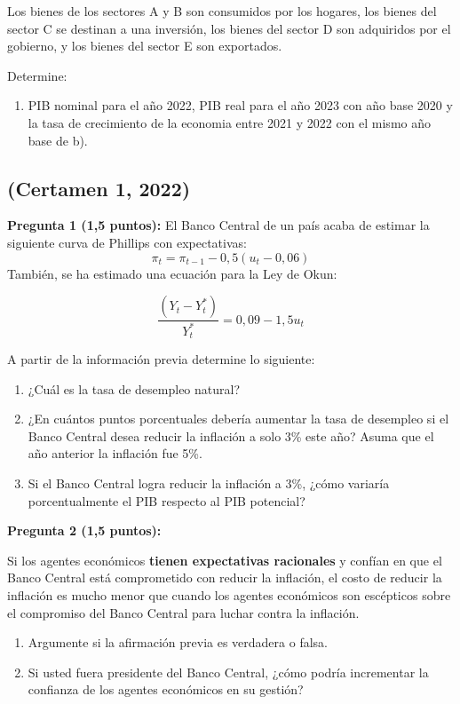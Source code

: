\documentclass[11pt,addpoints]{article}
\begin{document}
Los bienes de los sectores A y B son consumidos por los hogares, los bienes del sector C se destinan a una inversión, los bienes del sector D son adquiridos por el gobierno, y los bienes del sector E son exportados.

Determine:
\begin{enumerate}[label=\alph*)]
    \item PIB nominal para el año 2022, PIB real para el año 2023 con año base 2020 y la tasa de crecimiento de la economia entre 2021 y 2022 con el mismo año base de b).
\end{enumerate}


\subsection*{(Certamen 1, 2022)}
\textbf{Pregunta 1 (1,5 puntos):}  
El Banco Central de un país acaba de estimar la siguiente curva de Phillips con expectativas:  
\[
\pi_t = \pi_{t-1} - 0,5(u_t - 0,06)
\]
\newpage
\vspace*{0.1cm}
También, se ha estimado una ecuación para la Ley de Okun:  

\[
\frac{(Y_t - Y_t^*)}{Y_t^*} = 0,09 - 1,5u_t
\]

A partir de la información previa determine lo siguiente:  

\begin{enumerate}[label=\alph*)]
    \item ¿Cuál es la tasa de desempleo natural?  
    \item ¿En cuántos puntos porcentuales debería aumentar la tasa de desempleo si el Banco Central desea reducir la inflación a solo 3\% este año? Asuma que el año anterior la inflación fue 5\%.  
    \item Si el Banco Central logra reducir la inflación a 3\%, ¿cómo variaría porcentualmente el PIB respecto al PIB potencial?  
\end{enumerate}

\vspace{0.4cm}

\textbf{Pregunta 2 (1,5 puntos):}  

Si los agentes económicos \textbf{tienen expectativas racionales} y confían en que el Banco Central está comprometido con reducir la inflación, el costo de reducir la inflación es mucho menor que cuando los agentes económicos son escépticos sobre el compromiso del Banco Central para luchar contra la inflación.  

\begin{enumerate}[label=\alph*)]
    \item Argumente si la afirmación previa es verdadera o falsa.  
    \item Si usted fuera presidente del Banco Central, ¿cómo podría incrementar la confianza de los agentes económicos en su gestión?  
\end{enumerate}
\end{document}
